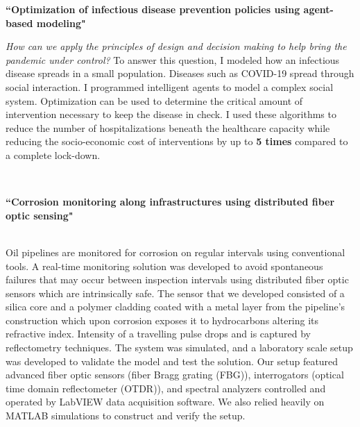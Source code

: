 \documentclass[10pt]{article} %
\begin{document}
\medskip %

{\raggedright\textbf{``Optimization of infectious disease prevention policies using agent-based modeling"}}
\textit{\center How can we apply the principles of design and decision making to help bring the pandemic under control?}
To answer this question, I modeled how an infectious disease spreads in a small population. Diseases such as COVID-19 spread through social interaction. I programmed intelligent agents to model a complex social system. Optimization can be used to determine the critical amount of intervention necessary to keep the disease in check. I used these algorithms to reduce the number of hospitalizations beneath the healthcare capacity while reducing the socio-economic cost of interventions by up to \textbf{5 times} compared to a complete lock-down.

~~~~

\medskip %


{\raggedright\textbf{``Corrosion monitoring along infrastructures using distributed fiber optic sensing"}}\\
Oil pipelines are monitored for corrosion on regular intervals using conventional tools. A real-time monitoring solution was developed to avoid spontaneous failures that may occur between inspection intervals using distributed fiber optic sensors which are intrinsically safe. The sensor that we developed consisted of a silica core and a polymer cladding coated with a metal layer from the pipeline’s construction which upon corrosion exposes it to hydrocarbons altering its refractive index. Intensity of a travelling pulse drops and is captured by reflectometry techniques. The system was simulated, and a laboratory scale setup was developed to validate the model and test the solution. Our setup featured advanced fiber optic sensors (fiber Bragg grating (FBG)), interrogators (optical time domain reflectometer (OTDR)), and spectral analyzers controlled and operated by LabVIEW data acquisition software. We also relied heavily on MATLAB simulations to construct and verify the setup.
\end{document}
